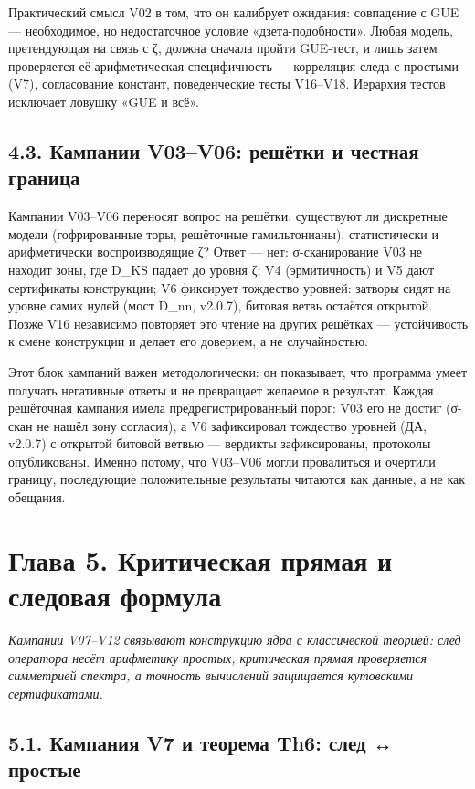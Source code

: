 \documentclass[11pt,a4paper]{article}
\begin{document}
Практический смысл V02 в том, что он калибрует ожидания: совпадение с GUE — необходимое, но недостаточное условие «дзета-подобности». Любая модель, претендующая на связь с ζ, должна сначала пройти GUE-тест, и лишь затем проверяется её арифметическая специфичность — корреляция следа с простыми (V7), согласование констант, поведенческие тесты V16–V18. Иерархия тестов исключает ловушку «GUE и всё».

\subsection{4.3. Кампании V03–V06: решётки и честная граница}

Кампании V03–V06 переносят вопрос на решётки: существуют ли дискретные модели (гофрированные торы, решёточные гамильтонианы), статистически и арифметически воспроизводящие ζ? Ответ — нет: σ-сканирование V03 не находит зоны, где D\_KS падает до уровня ζ; V4 (эрмитичность) и V5 дают сертификаты конструкции; V6 фиксирует тождество уровней: затворы сидят на уровне самих нулей (мост D\_nn, v2.0.7), битовая ветвь остаётся открытой. Позже V16 независимо повторяет это чтение на других решётках — устойчивость к смене конструкции и делает его доверием, а не случайностью.

Этот блок кампаний важен методологически: он показывает, что программа умеет получать негативные ответы и не превращает желаемое в результат. Каждая решёточная кампания имела предрегистрированный порог: V03 его не достиг (σ-скан не нашёл зону согласия), а V6 зафиксировал тождество уровней (ДА, v2.0.7) с открытой битовой ветвью — вердикты зафиксированы, протоколы опубликованы. Именно потому, что V03–V06 могли провалиться и очертили границу, последующие положительные результаты читаются как данные, а не как обещания.

\section{Глава 5. Критическая прямая и следовая формула}

\noindent\textit{\color{copper}Кампании V07–V12 связывают конструкцию ядра с классической теорией: след оператора несёт арифметику простых, критическая прямая проверяется симметрией спектра, а точность вычислений защищается кутовскими сертификатами.}

\subsection{5.1. Кампания V7 и теорема Th6: след ↔ простые}
\end{document}
